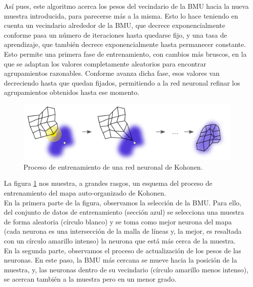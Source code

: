 Así pues, este algoritmo acerca los pesos del vecindario de la BMU hacia la nueva muestra introducida, para parecerse más a la misma. Esto lo hace teniendo en cuenta un vecindario alrededor de la BMU, que decrece exponencialmente conforme pasa un número de iteraciones hasta quedarse fijo, y una tasa de aprendizaje, que también decrece exponencialmente hasta permanecer constante. \\

Esto permite una primera fase de entrenamiento, con cambios más bruscos, en la que se adaptan los valores completamente aleatorios para encontrar agrupamientos razonables. Conforme avanza dicha fase, esos valores van decreciendo hasta que quedan fijados, permitiendo a la red neuronal refinar los agrupamientos obtenidos hasta ese momento.\\

\begin{figure}[H]
\centering
\includegraphics[width=1.0\textwidth]{imagenes/somtraining.png}
\caption{Proceso de entrenamiento de una red neuronal de Kohonen.}
\label{img:somtraining}
\end{figure}

La figura \ref{img:somtraining} nos muestra, a grandes rasgos, un esquema del proceso de entrenamiento del mapa auto-organizado de Kohonen.\\

En la primera parte de la figura, observamos la selección de la BMU. Para ello, del conjunto de datos de entrenamiento (sección azul) se selecciona una muestra de forma aleatoria (círculo blanco) y se toma como mejor neurona del mapa (cada neurona es una intersección de la malla de líneas y, la mejor, es resaltada con un círculo amarillo intenso) la neurona que está más cerca de la muestra.\\

En la segunda parte, observamos el proceso de actualización de los pesos de las neuronas. En este paso, la BMU más cercana se mueve hacia la posición de la muestra, y, las neuronas dentro de su vecindario (círculo amarillo menos intenso), se acercan también a la muestra pero en un menor grado.\\

